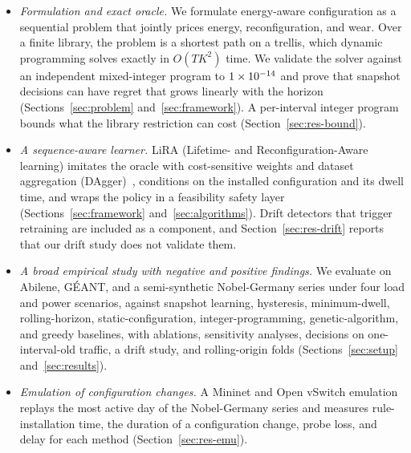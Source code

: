 \documentclass[preprint,12pt]{elsarticle}
\begin{document}
\begin{itemize}
\item \emph{Formulation and exact oracle.} We formulate energy-aware configuration as a sequential problem that jointly prices energy, reconfiguration, and wear. Over a finite library, the problem is a shortest path on a trellis, which dynamic programming solves exactly in $O(TK^2)$ time. We validate the solver against an independent mixed-integer program to $1\times10^{-14}$ and prove that snapshot decisions can have regret that grows linearly with the horizon (Sections~\ref{sec:problem} and~\ref{sec:framework}). A per-interval integer program bounds what the library restriction can cost (Section~\ref{sec:res-bound}).
\item \emph{A sequence-aware learner.} LiRA (Lifetime- and Reconfiguration-Aware learning) imitates the oracle with cost-sensitive weights and dataset aggregation (DAgger)~\cite{ross2011dagger}, conditions on the installed configuration and its dwell time, and wraps the policy in a feasibility safety layer (Sections~\ref{sec:framework} and~\ref{sec:algorithms}). Drift detectors that trigger retraining are included as a component, and Section~\ref{sec:res-drift} reports that our drift study does not validate them.
\item \emph{A broad empirical study with negative and positive findings.} We evaluate on Abilene, G\'{E}ANT, and a semi-synthetic Nobel-Germany series under four load and power scenarios, against snapshot learning, hysteresis, minimum-dwell, rolling-horizon, static-configuration, integer-programming, genetic-algorithm, and greedy baselines, with ablations, sensitivity analyses, decisions on one-interval-old traffic, a drift study, and rolling-origin folds (Sections~\ref{sec:setup} and~\ref{sec:results}).
\item \emph{Emulation of configuration changes.} A Mininet and Open vSwitch emulation replays the most active day of the Nobel-Germany series and measures rule-installation time, the duration of a configuration change, probe loss, and delay for each method (Section~\ref{sec:res-emu}).
\end{itemize}
\end{document}
